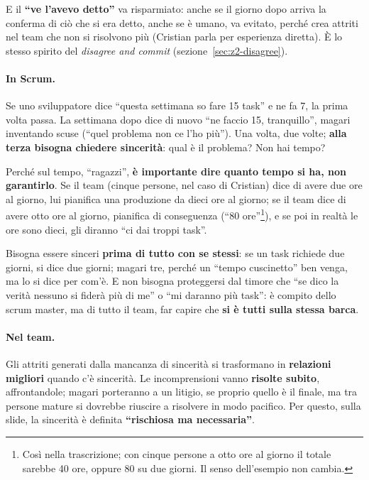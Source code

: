 E il \textbf{``ve l'avevo detto''} va risparmiato: anche se il giorno dopo arriva
la conferma di ciò che si era detto, anche se è umano, va evitato, perché crea
attriti nel team che non si risolvono più (Cristian parla per esperienza
diretta). È lo stesso spirito del \emph{disagree and commit}
(sezione~\ref{sec:z2-disagree}).

\paragraph{In Scrum.} Se uno sviluppatore dice ``questa settimana so fare 15
task'' e ne fa 7, la prima volta passa. La settimana dopo dice di nuovo ``ne
faccio 15, tranquillo'', magari inventando scuse (``quel problema non ce l'ho
più''). Una volta, due volte; \textbf{alla terza bisogna chiedere sincerità}: qual
è il problema? Non hai tempo?

Perché sul tempo, ``ragazzi'', \textbf{è importante dire quanto tempo si ha, non
garantirlo}. Se il team (cinque persone, nel caso di Cristian) dice di avere due
ore al giorno, lui pianifica una produzione da dieci ore al giorno; se il team
dice di avere otto ore al giorno, pianifica di conseguenza (``80
ore''\footnote{Così nella trascrizione; con cinque persone a otto ore al giorno
il totale sarebbe 40 ore, oppure 80 su due giorni. Il senso dell'esempio non
cambia.}), e se poi in realtà le ore sono dieci, gli diranno ``ci dai troppi
task''.

Bisogna essere sinceri \textbf{prima di tutto con se stessi}: se un task richiede
due giorni, si dice due giorni; magari tre, perché un ``tempo cuscinetto'' ben
venga, ma lo si dice per com'è. E non bisogna proteggersi dal timore che ``se
dico la verità nessuno si fiderà più di me'' o ``mi daranno più task'': è compito
dello scrum master, ma di tutto il team, far capire che \textbf{si è tutti sulla
stessa barca}.

\paragraph{Nel team.} Gli attriti generati dalla mancanza di sincerità si
trasformano in \textbf{relazioni migliori} quando c'è sincerità. Le
incomprensioni vanno \textbf{risolte subito}, affrontandole; magari porteranno a
un litigio, se proprio quello è il finale, ma tra persone mature si dovrebbe
riuscire a risolvere in modo pacifico. Per questo, sulla slide, la sincerità è
definita \textbf{``rischiosa ma necessaria''}.

